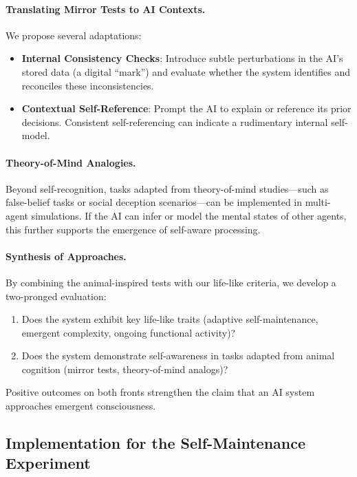 \documentclass[12pt]{article}
\begin{document}
\paragraph{Translating Mirror Tests to AI Contexts.}
We propose several adaptations:
\begin{itemize}
    \item \textbf{Internal Consistency Checks}: Introduce subtle perturbations in the AI’s
          stored data (a digital ``mark'') and evaluate whether the system identifies
          and reconciles these inconsistencies.
    \item \textbf{Contextual Self-Reference}: Prompt the AI to explain or reference
          its prior decisions. Consistent self-referencing can indicate a rudimentary
          internal self-model.
\end{itemize}

\paragraph{Theory-of-Mind Analogies.}
Beyond self-recognition, tasks adapted from theory-of-mind studies---such as
false-belief tasks or social deception scenarios---can be implemented in multi-agent
simulations. If the AI can infer or model the mental states of other agents, this
further supports the emergence of self-aware processing.

\paragraph{Synthesis of Approaches.}
By combining the animal-inspired tests with our life-like criteria, we develop a
two-pronged evaluation:
\begin{enumerate}
    \item Does the system exhibit key life-like traits (adaptive self-maintenance,
          emergent complexity, ongoing functional activity)?
    \item Does the system demonstrate self-awareness in tasks adapted from animal
          cognition (mirror tests, theory-of-mind analogs)?
\end{enumerate}
Positive outcomes on both fronts strengthen the claim that an AI system approaches
emergent consciousness.

\subsection{Implementation for the Self-Maintenance Experiment}
\label{subsec:self_maint_implementation}
\end{document}
